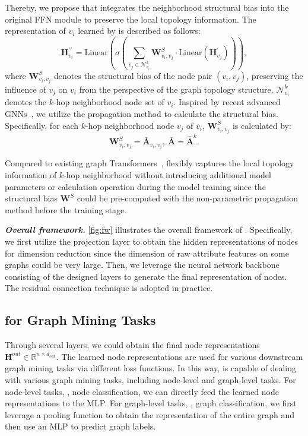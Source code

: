 \documentclass[sigconf, screen]{acmart}
\begin{document}
Thereby, we propose \sffn that integrates the neighborhood structural bias into the original FFN module to preserve the local topology information. 
The representation of $v_i$ learned by \sffn is described as follows:
\begin{equation}
    \mathbf{H}_{v_i}^{\prime\prime} = \mathrm{Linear}\left(\sigma
    \left(\sum_{v_j \in \mathcal{N}_{v_i}^{k}} \mathbf{W}^{S}_{v_i,v_j} \cdot \mathrm{Linear}(\mathbf{H}_{v_j}^{\prime})\right)\right),
    \label{sffn}
\end{equation}
where $\mathbf{W}^{S}_{v_i,v_j}$ denotes the structural bias of the node pair $(v_i, v_j)$, preserving the influence of $v_j$ on $v_i$ from the perspective of the graph topology structure.
$\mathcal{N}_{v_i}^{k}$ denotes the $k$-hop neighborhood node set of $v_i$. 
Inspired by recent advanced GNNs~\cite{sgc,rlp,gdc}, we utilize the propagation method to calculate the structural bias. 
Specifically, for each $k$-hop neighborhood node $v_j$ of $v_i$, $\mathbf{W}^{S}_{v_i,v_j}$ is calculated by: 
\begin{equation}
    \mathbf{W}^{S}_{v_i,v_j}=\bar{\mathbf{A}}_{v_i,v_j}, ~ \bar{\mathbf{A}} =\hat{\mathbf{A}}^{k}.
    \label{graphbias}
\end{equation}

Compared to existing graph Transformers~\cite{nodeformer,gps,transformer}, 
\sffn flexibly captures the local topology information of $k$-hop neighborhood without introducing additional model parameters or calculation operation during the model training since the structural bias $\mathbf{W}^{S}$ could be pre-computed with the non-parametric propagation method before the training stage.

\textit{\textbf{Overall framework.}}
\autoref{fig:fw} illustrates the overall framework of \name.
Specifically, we first utilize the projection layer to obtain the hidden representations of nodes for dimension reduction since the dimension of raw attribute features on some graphs could be very large.
Then, we leverage the neural network backbone consisting of the designed layers to generate the final representation of nodes.
The residual connection technique is adopted in practice.

\subsection{\name for Graph Mining Tasks}
Through several \name layers, we could obtain the final node representations $\mathbf{H}^{out}\in \mathbb{R}^{n \times d_{out}}$. 
The learned node representations are used for various downstream graph mining tasks via different loss functions.
In this way, \name is capable of dealing with various graph mining tasks, including node-level and graph-level tasks. 
For node-level tasks, \eg, node classification, we can directly feed the learned node representations to the MLP.
For graph-level tasks, \eg, graph classification, we first leverage a pooling function to obtain the representation of the entire graph and then use an MLP to predict graph labels.
\end{document}
